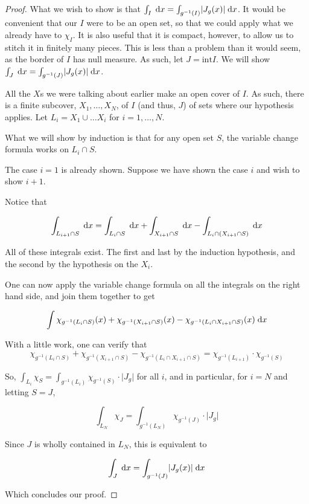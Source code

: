 \documentclass[11pt]{article}
\theoremstyle{definition}
\theoremstyle{plain}
\newcommand{\mo}{^{-1}}
\begin{document}
\begin{proof}
What we wish to show is that $\int_I \d x = \int_{g\mo(I)} \rvert J_g(x) \lvert \d x$. It would be convenient that our $I$ were to be an open set, so that we could apply what we already have to $\chi_I$. It is also useful that it is compact, however, to allow us to stitch it in finitely many pieces. This is less than a problem than it would seem, as the border of $I$ has null measure. As such, let $J = \textrm{int} I$. We will show $\int_J \d x = \int_{g\mo(J)} \rvert J_g(x) \lvert \d x$.

All the $X$s we were talking about earlier make an open cover of $I$. As such, there is a finite subcover, $X_1, \ldots, X_N$, of $I$ (and thus, $J$) of sets where our hypothesis applies. Let $L_i = X_1 \cup \ldots X_i$ for $i = 1, \ldots, N$.

What we will show by induction is that for any open set $S$, the variable change formula works on $L_i \cap S$.

The case $i = 1$ is already shown. Suppose we have shown the case $i$ and wish to show $i+1$.

Notice that

\[\int_{L_{i+1} \cap S} \d x = \int_{L_i \cap S} \d x + \int_{X_{i+1} \cap S} \d x  - \int_{L_i \cap (X_{i+1} \cap S)} \d x\]

All of these integrals exist. The first and last by the induction hypothesis, and the second by the hypothesis on the $X_i$.

One can now apply the variable change formula on all the integrals on the right hand side, and join them together to get

\[ \int \chi_{g\mo(L_i \cap S)}(x) + \chi_{g\mo(X_{i+1} \cap S)}(x) - \chi_{g\mo(L_i \cap X_{i+1}\cap S)}(x) \d x \]

With a little work, one can verify that
\[\chi_{g\mo(L_i \cap S)} + \chi_{g\mo(X_{i+1} \cap S)} - \chi_{g\mo(L_i \cap X_{i+1}\cap S)} = \chi_{g\mo(L_{i+1})} \cdot \chi_{g\mo(S)}\]

So, $\int_{L_i} \chi_S = \int_{g\mo(L_i)} \chi_{g\mo(S)} \cdot \lvert J_g \rvert$ for all $i$, and in particular, for $i = N$ and letting $S = J$,

\[ \int_{L_N} \chi_J = \int_{g\mo(L_N)} \chi_{g\mo(J)} \cdot \lvert J_g \rvert \]

Since $J$ is wholly contained in $L_N$, this is equivalent to

\[ \int_J \d x = \int_{g\mo(J)} \lvert J_g(x) \rvert \d x \]

Which concludes our proof.

\end{proof}
\end{document}
